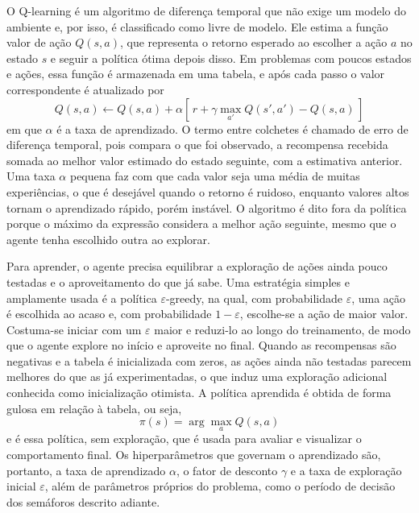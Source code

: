 \documentclass[12pt]{article}
\begin{document}
O Q-learning \cite{Watkins1992} é um algoritmo de diferença temporal que não exige um modelo do ambiente e, por isso, é
classificado como livre de modelo. Ele estima a função valor de ação $Q(s,a)$, que representa o retorno esperado ao
escolher a ação $a$ no estado $s$ e seguir a política ótima depois disso. Em problemas com poucos estados e ações, essa
função é armazenada em uma tabela, e após cada passo o valor correspondente é atualizado por
\begin{equation}
  Q(s,a) \leftarrow Q(s,a) + \alpha \left[\, r + \gamma \max_{a'} Q(s',a') - Q(s,a) \,\right]
  \label{eq:q}
\end{equation}
em que $\alpha$ é a taxa de aprendizado. O termo entre colchetes é chamado de erro de diferença temporal, pois compara o
que foi observado, a recompensa recebida somada ao melhor valor estimado do estado seguinte, com a estimativa anterior.
Uma taxa $\alpha$ pequena faz com que cada valor seja uma média de muitas experiências, o que é desejável quando o retorno
é ruidoso, enquanto valores altos tornam o aprendizado rápido, porém instável. O algoritmo é dito fora da política porque o
máximo da expressão considera a melhor ação seguinte, mesmo que o agente tenha escolhido outra ao explorar.

Para aprender, o agente precisa equilibrar a exploração de ações ainda pouco testadas e o aproveitamento do que já sabe.
Uma estratégia simples e amplamente usada é a política $\varepsilon$-greedy, na qual, com probabilidade $\varepsilon$, uma
ação é escolhida ao acaso e, com probabilidade $1-\varepsilon$, escolhe-se a ação de maior valor. Costuma-se iniciar com um
$\varepsilon$ maior e reduzi-lo ao longo do treinamento, de modo que o agente explore no início e aproveite no final.
Quando as recompensas são negativas e a tabela é inicializada com zeros, as ações ainda não testadas parecem melhores do
que as já experimentadas, o que induz uma exploração adicional conhecida como inicialização otimista. A política aprendida
é obtida de forma gulosa em relação à tabela, ou seja,
\begin{equation}
  \pi(s) = \arg\max_{a} Q(s,a)
  \label{eq:politica}
\end{equation}
e é essa política, sem exploração, que é usada para avaliar e visualizar o comportamento final. Os hiperparâmetros que
governam o aprendizado são, portanto, a taxa de aprendizado $\alpha$, o fator de desconto $\gamma$ e a taxa de exploração
inicial $\varepsilon$, além de parâmetros próprios do problema, como o período de decisão dos semáforos descrito adiante.
\end{document}
